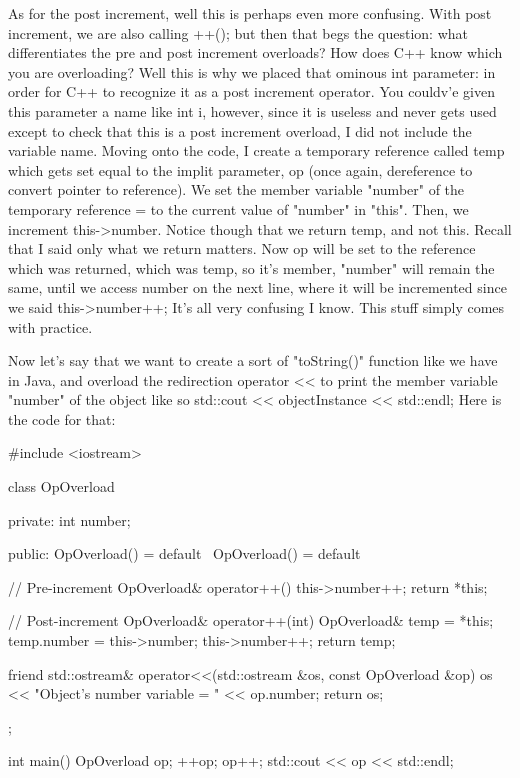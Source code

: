 \documentclass{article}
\begin{document}
As for the post increment, well this is perhaps even more confusing. With post increment, we are also calling
++(); but then that begs the question: what differentiates the pre and post increment overloads? How does C++
know which you are overloading? Well this is why we placed that ominous int parameter: in order for C++ to
recognize it as a post increment operator. You couldv’e given this parameter a name like int i, however,
since it is useless and never gets used except to check that this is a post increment overload, I did not
include the variable name. Moving onto the code, I create a temporary reference called temp which gets set
equal to the implit parameter, op (once again, dereference to convert pointer to reference). We set the
member variable "number" of the temporary reference = to the current value of "number" in "this". Then, we
increment this->number. Notice though that we return temp, and not this. Recall that I said only what we
return matters. Now op will be set to the reference which was returned, which was temp, so it's member,
"number" will remain the same, until we access number on the next line, where it will be incremented since we
said this->number++; It’s all very confusing I know. This stuff simply comes with practice.

Now let’s say that we want to create a sort of "toString()" function like we have in Java, and overload the
redirection operator << to print the member variable "number" of the object like so std::cout <<
objectInstance << std::endl; Here is the code for that:

\begin{cpplst}

#include <iostream>

class OpOverload
{
private:
   int number;

public:
    OpOverload() = default
    ~OpOverload() = default

    // Pre-increment
    OpOverload& operator++()
    {
        this->number++;
        return *this;
    }

    // Post-increment
    OpOverload& operator++(int)
    {
        OpOverload& temp = *this;
        temp.number = this->number;
        this->number++;
        return temp;
    }

    friend std::ostream& operator<<(std::ostream &os, const OpOverload &op)
    {
        os << "Object’s number variable = " << op.number;
        return os;
    }
};

int main()
{
    OpOverload op;
    ++op;
    op++;
    std::cout << op << std::endl;
}

\end{cpplst}
\end{document}
